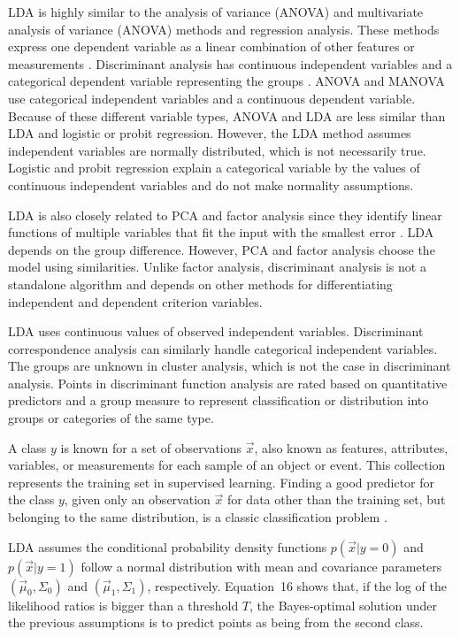 \documentclass[preprint,12pt]{elsarticle}
\begin{document}
LDA is highly similar to the analysis of variance (ANOVA) and multivariate analysis of variance (ANOVA) methods and regression analysis. These methods express one dependent variable as a linear combination of other features or measurements \cite{fisher1936use, mclachlan2005discriminant}. Discriminant analysis has continuous independent variables and a categorical dependent variable representing the groups \cite{wetcher2011analyzing}. ANOVA and MANOVA use categorical independent variables and a continuous dependent variable. Because of these different variable types, ANOVA and LDA are less similar than LDA and logistic or probit regression. However, the LDA method assumes independent variables are normally distributed, which is not necessarily true. Logistic and probit regression explain a categorical variable by the values of continuous independent variables and do not make normality assumptions.

LDA is also closely related to PCA and factor analysis since they identify linear functions of multiple variables that fit the input with the smallest error \cite{martinez2001pca}. LDA depends on the group difference. However, PCA and factor analysis choose the model using similarities. Unlike factor analysis, discriminant analysis is not a standalone algorithm and depends on other methods for differentiating independent and dependent criterion variables.

LDA uses continuous values of observed independent variables. Discriminant correspondence analysis \cite{abdi2007discriminant, perriere2003use} can similarly handle categorical independent variables. The groups are unknown in cluster analysis, which is not the case in discriminant analysis. Points in discriminant function analysis are rated based on quantitative predictors and a group measure \cite{cokluk2008discriminant} to represent classification or distribution into groups or categories of the same type.

A class $y$ is known for a set of observations $\vec{x}$, also known as features, attributes, variables, or measurements for each sample of an object or event. This collection represents the training set in supervised learning. Finding a good predictor for the class $y$, given only an observation $\vec{x}$ for data other than the training set, but belonging to the same distribution, is a classic classification problem \cite{venables2013modern}.

LDA assumes the conditional probability density functions $p({\vec{x}}|y=0)$ and $p({\vec{x}}|y=1)$ follow a normal distribution with mean and covariance parameters $\left({\vec{\mu}}_{0},\Sigma_{0}\right)$ and $\left({\vec{\mu}}_{1},\Sigma_{1}\right)$, respectively. Equation~16 shows that, if the log of the likelihood ratios is bigger than a threshold $T$, the Bayes-optimal solution under the previous assumptions is to predict points as being from the second class.
\end{document}
